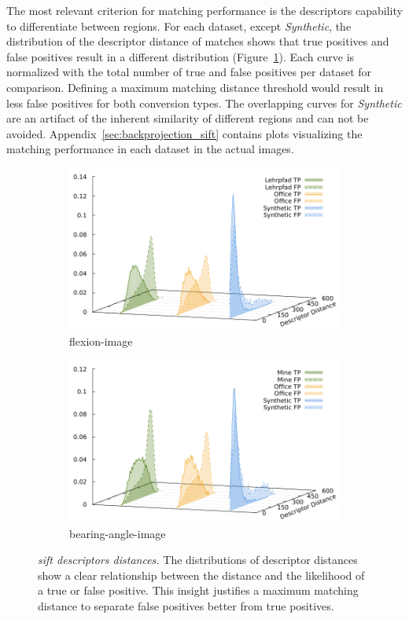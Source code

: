 The most relevant criterion for matching performance is the descriptors capability to differentiate between regions.
For each dataset, except \emph{Synthetic}, the distribution of the descriptor distance of matches shows that true positives and false positives result in a different distribution (Figure~\ref{fig:sift_descriptor_distance}).
Each curve is normalized with the total number of true and false positives per dataset for comparison.
Defining a maximum matching distance threshold would result in less false positives for both conversion types.
The overlapping curves for \emph{Synthetic} are an artifact of the inherent similarity of different regions and can not be avoided.
Appendix~\ref{sec:backprojection_sift} contains plots visualizing the matching performance in each dataset in the actual images.
\begin{figure}[t]
\begin{subfigure}[t]{0.45\linewidth}
    \includegraphics[width=\linewidth]{chapter06/results/SIFT/flexion/descriptor_distances.pdf}%
    \caption{\gls{flexion-image}}
\end{subfigure}\quad
\begin{subfigure}[t]{0.45\linewidth}
    \includegraphics[width=\linewidth]{chapter06/results/SIFT/bearing/descriptor_distances.pdf}%
    \caption{\gls{bearing-angle-image}}
\end{subfigure}
\caption[\acrshort{sift} descriptors distances]{\emph{\acrshort{sift} descriptors distances.} The distributions of descriptor distances show a clear relationship between the distance and the likelihood of a true or false positive. This insight justifies a maximum matching distance to separate false positives better from true positives.}\label{fig:sift_descriptor_distance}
\end{figure}
